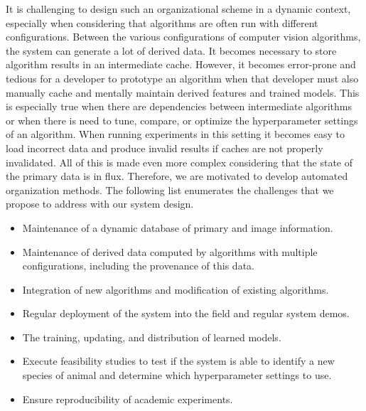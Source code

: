     It is challenging to design such an organizational scheme in a dynamic
      context, especially when considering that algorithms are often run with
      different configurations.
    Between the various configurations of computer vision algorithms, the
      system can generate a lot of derived data.
    It becomes necessary to store algorithm results in an intermediate cache.
    However, it becomes error-prone and tedious for a developer to prototype
      an algorithm when that developer must also manually cache and mentally
      maintain derived features and trained models.
    This is especially true when there are dependencies between intermediate
      algorithms or when there is need to tune, compare, or optimize the
      hyperparameter settings of an algorithm.
    When running experiments in this setting it becomes easy to load incorrect
      data and produce invalid results if caches are not properly invalidated.
    All of this is made even more complex considering that the state of the
      primary data is in flux.
    Therefore, we are motivated to develop automated organization methods.
    The following list enumerates the challenges that we propose to address
      with our system design.
    \begin{itemize}
        \item Maintenance of a dynamic database of primary \annot{} and image
          information.

        \item Maintenance of derived data computed by algorithms with multiple
          configurations, including the provenance of this data.

        \item Integration of new algorithms and modification of existing
          algorithms.

        \item Regular deployment of the system into the field and regular
          system demos.

        \item The training, updating, and distribution of learned models.

        \item Execute feasibility studies to test if the system is able to
          identify a new species of animal and determine which hyperparameter
          settings to use.

        \item Ensure reproducibility of academic experiments.
    \end{itemize}

